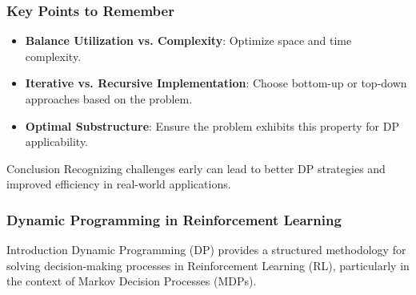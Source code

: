 \documentclass[aspectratio=169]{beamer}
\begin{document}
\begin{frame}[fragile]
    \frametitle{Key Points to Remember}
    \begin{itemize}
        \item \textbf{Balance Utilization vs. Complexity}: Optimize space and time complexity.
        \item \textbf{Iterative vs. Recursive Implementation}: Choose bottom-up or top-down approaches based on the problem.
        \item \textbf{Optimal Substructure}: Ensure the problem exhibits this property for DP applicability.
    \end{itemize}
    \begin{block}{Conclusion}
        Recognizing challenges early can lead to better DP strategies and improved efficiency in real-world applications.
    \end{block}
\end{frame}

\begin{frame}[fragile]
    \frametitle{Dynamic Programming in Reinforcement Learning}
    \begin{block}{Introduction}
        Dynamic Programming (DP) provides a structured methodology for solving decision-making processes in Reinforcement Learning (RL), particularly in the context of Markov Decision Processes (MDPs). 
    \end{block}
\end{frame}
\end{document}

